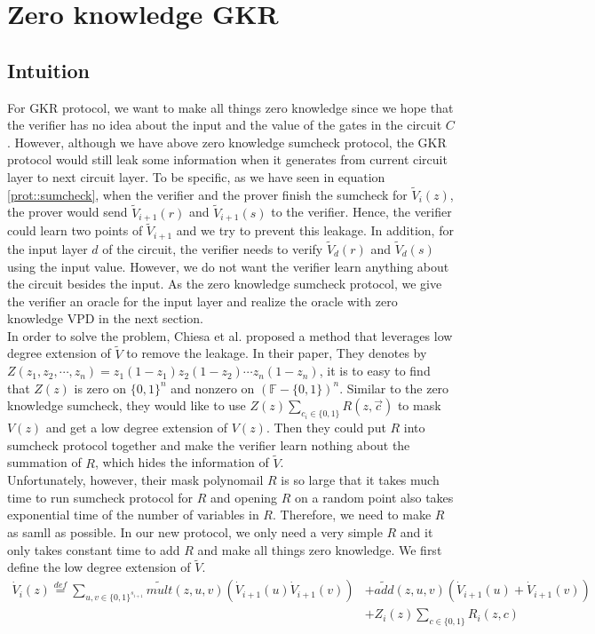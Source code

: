 \section{Zero knowledge GKR}

\subsection{Intuition}
For GKR protocol, we want to make all things zero knowledge since we hope that the verifier has no idea about the input and the value of the gates in the circuit $C$. However, although we have above zero knowledge sumcheck protocol, the GKR protocol would still leak some information when it generates from current circuit layer to next circuit layer. To be specific, as we have seen in equation \ref{prot::sumcheck}, when the verifier and the prover finish the sumcheck for $\tilde{V}_i(z)$, the prover would send $\tilde{V}_{i+1}(r)$ and $\tilde{V}_{i+1}(s)$ to the verifier. Hence, the verifier could learn two points of $\tilde{V}_{i+1}$ and we try to prevent this leakage. In addition, for the input layer $d$ of the circuit, the verifier needs to verify $\tilde{V}_d(r)$ and $\tilde{V}_d(s)$ using the input value. However, we do not want the verifier learn anything about the circuit besides the input. As the zero knowledge sumcheck protocol, we give the verifier an oracle for the input layer and realize the oracle with zero knowledge VPD in the next section. \\

In order to solve the problem, Chiesa et al.\cite{zksumcheck} proposed a method that leverages low degree extension of $\tilde{V}$ to remove the leakage. In their paper, They denotes by $Z(z_1, z_2, \cdots, z_n) = z_1(1-z_1)z_2(1-z_2) \cdots z_n(1-z_n)$, it is to easy to find that $Z(z)$ is zero on $\{0, 1\}^n$ and nonzero on $(\mathbb{F} - \{0, 1\})^n$. Similar to the zero knowledge sumcheck, they would like to use $Z(z) \sum\limits_{c_i \in \{0, 1\}}R(z, \vec{c})$ to mask $V(z)$ and get a low degree extension of $V(z)$. Then they could put $R$ into sumcheck protocol together and make the verifier learn nothing about the summation of $R$, which hides the information of $\tilde{V}$.\\

Unfortunately, however, their mask polynomail $R$ is so large that it takes much time to run sumcheck protocol for $R$ and opening $R$ on a random point also takes exponential time of the number of variables in $R$. Therefore, we need to make $R$ as samll as possible. In our new protocol, we only need a very simple $R$ and it only takes constant time to add $R$ and make all things zero knowledge. We first define the low degree extension of $\tilde{V}$.\\ 
\begin{align*}
\dot{V}_{i}(z) \overset{def}{=}\sum_{u, v\in \{0,1\}^{s_{i+1}}}\tilde{mult}(z, u, v)(\dot{V}_{i+1}(u)\dot{V}_{i+1}(v))&+\tilde{add}(z,u,v)(\dot{V}_{i+1}(u)+\dot{V}_{i+1}(v))\\
 &+ Z_i(z)\sum\limits_{c \in \{0, 1\}}R_i(z, c)\\
\end{align*}

